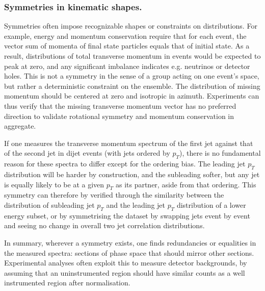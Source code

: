         \subsubsection{Symmetries in kinematic shapes.}
            Symmetries often impose recognizable shapes or constraints on distributions.
            For example, energy and momentum conservation require that for each event, the vector sum of momenta of final state particles equals that of initial state.
            As a result, distributions of total transverse momentum in events would be expected to peak at zero, and any significant imbalance indicates e.g. neutrinos or detector holes.
            This is not a symmetry in the sense of a group acting on one event's space, but rather a deterministic constraint on the ensemble.
            The distribution of missing momentum should be centered at zero and isotropic in azimuth.
            Experiments can thus verify that the missing transverse momentum vector has no preferred direction to validate rotational symmetry and momentum conservation in aggregate.
            
            If one measures the transverse momentum spectrum of the first jet against that of the second jet in dijet events (with jets ordered by $p_T$), there is no fundamental reason for these spectra to differ except for the ordering bias.
            The leading jet $p_T$ distribution will be harder by construction, and the subleading softer, but any jet is equally likely to be at a given $p_T$ as its partner, aside from that ordering.
            This symmetry can therefore by verified through the similarity between the distribution of subleading jet $p_T$ and the leading jet $p_T$ distribution of a lower energy subset, or by symmetrising the dataset by swapping jets event by event and seeing no change in overall two jet correlation distributions.
            
            In summary, wherever a symmetry exists, one finds redundancies or equalities in the measured spectra: sections of phase space that should mirror other sections.
            Experimental analyses often exploit this to measure detector backgrounds, by assuming that an uninstrumented region should have similar counts as a well instrumented region after normalisation.

